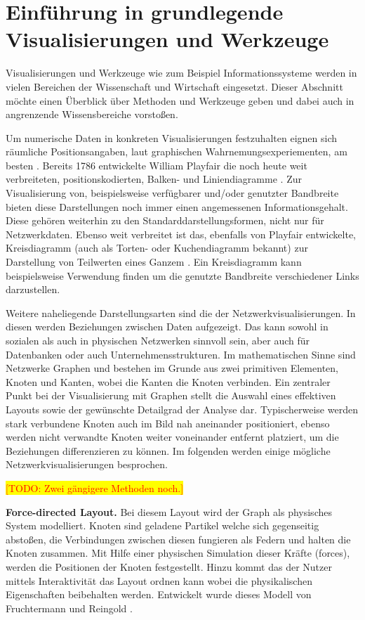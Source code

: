 \documentclass[draft=false
              ,paper=a4
              ,twoside=false
              ,fontsize=11pt
              ,headsepline
              ,BCOR10mm
              ,DIV11
              ]{scrbook}
\newcommand{\TODO}[1]{\colorbox{yellow}{\textcolor{red}{[TODO: #1]}}}
\begin{document}
\section{Einführung in grundlegende Visualisierungen und Werkzeuge} %
\label{sec:visualisierungen_und_werkzeuge}

Visualisierungen und Werkzeuge wie zum Beispiel Informationssysteme werden in vielen Bereichen der Wissenschaft und Wirtschaft eingesetzt. Dieser Abschnitt möchte einen Überblick über Methoden und Werkzeuge geben und dabei auch in angrenzende Wissensbereiche vorstoßen. 

Um numerische Daten in konkreten Visualisierungen festzuhalten eignen sich räumliche Positionsangaben, laut graphischen Wahrnemungsexperiementen, am besten \cite{heer_tour_2010}. Bereits 1786 entwickelte William Playfair die noch heute weit verbreiteten, positionskodierten, Balken- und Liniendiagramme \cite{playfair_playfairs_1768}. Zur Visualisierung von, beispielsweise verfügbarer und/oder genutzter Bandbreite bieten diese Darstellungen noch immer einen angemessenen Informationsgehalt. Diese gehören weiterhin zu den Standarddarstellungsformen, nicht nur für Netzwerkdaten. Ebenso weit verbreitet ist das, ebenfalls von Playfair entwickelte, Kreisdiagramm (auch als Torten- oder Kuchendiagramm bekannt) zur Darstellung von Teilwerten eines Ganzem \cite{playfair_statistical_1801}. Ein Kreisdiagramm kann beispielsweise Verwendung finden um die genutzte Bandbreite verschiedener Links darzustellen. 

Weitere naheliegende Darstellungsarten sind die der Netzwerkvisualisierungen. In diesen werden Beziehungen zwischen Daten aufgezeigt. Das kann sowohl in sozialen als auch in physischen Netzwerken sinnvoll sein, aber auch für Datenbanken oder auch Unternehmensstrukturen. Im mathematischen Sinne sind Netzwerke Graphen und bestehen im Grunde aus zwei primitiven Elementen, Knoten und Kanten, wobei die Kanten die Knoten verbinden. Ein zentraler Punkt bei der Visualisierung mit Graphen stellt die Auswahl eines effektiven Layouts sowie der gewünschte Detailgrad der Analyse dar. Typischerweise werden stark verbundene Knoten auch im Bild nah aneinander positioniert, ebenso werden nicht verwandte Knoten weiter voneinander entfernt platziert, um die Beziehungen differenzieren zu können. Im folgenden werden einige mögliche Netzwerkvisualisierungen besprochen.

\TODO{Zwei gängigere Methoden noch.}

\textbf{Force-directed Layout.}  Bei diesem Layout wird der Graph als physisches System modelliert. Knoten sind geladene Partikel welche sich gegenseitig abstoßen, die Verbindungen zwischen diesen fungieren als Federn und halten die Knoten zusammen. Mit Hilfe einer physischen Simulation dieser Kräfte (forces), werden die Positionen der Knoten festgestellt. Hinzu kommt das der Nutzer mittels Interaktivität das Layout ordnen kann wobei die physikalischen Eigenschaften beibehalten werden. Entwickelt wurde dieses Modell von Fruchtermann und Reingold \cite{Fruchterman91graphdrawing}. 
\end{document}
